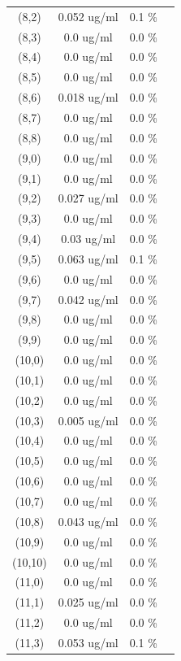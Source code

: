 \documentclass{article}
\begin{document}
\begin{tabular}{c c c c}
(8,2)&        0.052 ug/ml        &0.1 \%\\
(8,3)&        0.0 ug/ml        &0.0 \%\\
(8,4)&        0.0 ug/ml        &0.0 \%\\
(8,5)&        0.0 ug/ml        &0.0 \%\\
(8,6)&        0.018 ug/ml        &0.0 \%\\
(8,7)&        0.0 ug/ml        &0.0 \%\\
(8,8)&        0.0 ug/ml        &0.0 \%\\
(9,0)&        0.0 ug/ml        &0.0 \%\\
(9,1)&        0.0 ug/ml        &0.0 \%\\
(9,2)&        0.027 ug/ml        &0.0 \%\\
(9,3)&        0.0 ug/ml        &0.0 \%\\
(9,4)&        0.03 ug/ml        &0.0 \%\\
(9,5)&        0.063 ug/ml        &0.1 \%\\
(9,6)&        0.0 ug/ml        &0.0 \%\\
(9,7)&        0.042 ug/ml        &0.0 \%\\
(9,8)&        0.0 ug/ml        &0.0 \%\\
(9,9)&        0.0 ug/ml        &0.0 \%\\
(10,0)&        0.0 ug/ml        &0.0 \%\\
(10,1)&        0.0 ug/ml        &0.0 \%\\
(10,2)&        0.0 ug/ml        &0.0 \%\\
(10,3)&        0.005 ug/ml        &0.0 \%\\
(10,4)&        0.0 ug/ml        &0.0 \%\\
(10,5)&        0.0 ug/ml        &0.0 \%\\
(10,6)&        0.0 ug/ml        &0.0 \%\\
(10,7)&        0.0 ug/ml        &0.0 \%\\
(10,8)&        0.043 ug/ml        &0.0 \%\\
(10,9)&        0.0 ug/ml        &0.0 \%\\
(10,10)&        0.0 ug/ml        &0.0 \%\\
(11,0)&        0.0 ug/ml        &0.0 \%\\
(11,1)&        0.025 ug/ml        &0.0 \%\\
(11,2)&        0.0 ug/ml        &0.0 \%\\
(11,3)&        0.053 ug/ml        &0.1 \%\\

\end{tabular}
\end{document}

